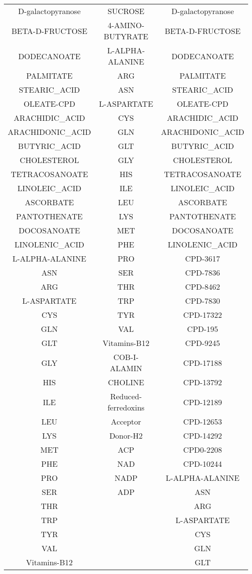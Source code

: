 \documentclass[../main.tex]{subfiles}
\begin{document}
\begin{table}[H]
\begin{adjustbox}{width=0.43\textwidth}
\begin{tabular}{|c|c|c|}
D-galactopyranose&	SUCROSE	&D-galactopyranose \\
BETA-D-FRUCTOSE&	4-AMINO-BUTYRATE	&BETA-D-FRUCTOSE \\
DODECANOATE&	L-ALPHA-ALANINE	&DODECANOATE \\
PALMITATE	&ARG	&PALMITATE \\
STEARIC\_ACID	&ASN&	STEARIC\_ACID \\
OLEATE-CPD&	L-ASPARTATE	&OLEATE-CPD \\
ARACHIDIC\_ACID&	CYS&	ARACHIDIC\_ACID \\
ARACHIDONIC\_ACID	&GLN	&ARACHIDONIC\_ACID \\
BUTYRIC\_ACID&	GLT&	BUTYRIC\_ACID \\
CHOLESTEROL&	GLY	&CHOLESTEROL \\
TETRACOSANOATE&	HIS	&TETRACOSANOATE \\
LINOLEIC\_ACID	&ILE	&LINOLEIC\_ACID \\
ASCORBATE&	LEU	&ASCORBATE \\
PANTOTHENATE	&LYS&	PANTOTHENATE \\
DOCOSANOATE	& MET	&DOCOSANOATE \\
LINOLENIC\_ACID	&PHE&	LINOLENIC\_ACID \\
L-ALPHA-ALANINE&	PRO	&CPD-3617 \\
ASN	&SER	&CPD-7836 \\
ARG	&THR	&CPD-8462 \\
L-ASPARTATE&	TRP	&CPD-7830 \\
CYS	&TYR&	CPD-17322 \\
GLN	&VAL	&CPD-195 \\
GLT	&Vitamins-B12	&CPD-9245 \\
GLY&	COB-I-ALAMIN&	CPD-17188 \\
HIS	&CHOLINE&	CPD-13792 \\
ILE	&Reduced-ferredoxins	&CPD-12189 \\
LEU&	Acceptor	&CPD-12653 \\
LYS	& Donor-H2 	& CPD-14292 \\
MET	& ACP	& CPD0-2208 \\
PHE	& NAD	& CPD-10244 \\
PRO	 & NADP& 	L-ALPHA-ALANINE \\
SER	& ADP & 	ASN \\
THR	& &	ARG \\
TRP	& &	L-ASPARTATE \\
TYR	& &	CYS \\
VAL	& &	GLN \\
Vitamins-B12 & &		GLT \\

\end{tabular}
\end{adjustbox}
\end{table}
\end{document}
